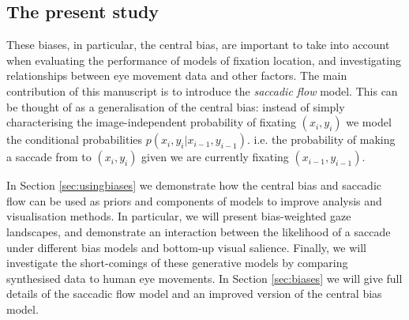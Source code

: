 \subsection{The present study}

These biases, in particular, the central bias, are important to take into account when evaluating the performance of models of fixation location, and investigating relationships between eye movement data and other factors. The main contribution of this manuscript is to introduce the \textit{saccadic flow} model. This can be thought of as a generalisation of the central bias: instead of simply characterising the image-independent probability of fixating $(x_i, y_i)$ we model the conditional probabilities $p(x_i,y_i|x_{i-1}, y_{i-1})$. i.e. the probability of making a saccade from to $(x_i,y_i)$ given we are currently fixating $(x_{i-1}, y_{i-1})$.

In Section \ref{sec:usingbiases} we demonstrate how the central bias and saccadic flow can be used as priors and components of models to improve analysis and visualisation methods. In particular, we will present bias-weighted gaze landscapes, and demonstrate an interaction between the likelihood of a saccade under different bias models and bottom-up visual salience. Finally, we will investigate the short-comings of these generative models by comparing synthesised data to human eye movements. In Section \ref{sec:biases} we will give full details of the saccadic flow model and an improved version of the central bias model. 

